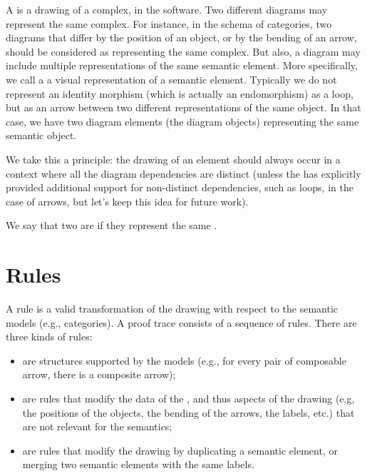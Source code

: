 \documentclass{article}
\newtheorem{remark}{Remark}[section]
\begin{document}
A \AP{} is a drawing of a complex, in the software. 
Two different diagrams may represent the same complex. For instance, in the schema of categories, two diagrams that differ by the position of an object, or by the bending of an arrow, should be considered as representing the same complex.
But also, a diagram may include multiple representations of the same semantic element. More specifically, we call a \AP{} a visual representation of a semantic element. Typically we do not represent an identity morphism (which is actually an endomorphism) as a loop, but as an arrow between two different representations of the same object. In that case, we have two diagram elements (the diagram objects) representing the same semantic object.

We take this a principle: the drawing of an element should always occur in a context where all the diagram dependencies are distinct (unless the  has explicitly provided additional support for non-distinct dependencies, such as loops, in the case of arrows, but let's keep this idea for future work).
 
We say that two  are \AP{} if they represent the same .





\section{Rules}

A rule is a valid transformation of the drawing with respect to the semantic models (e.g., categories). A proof trace consists of a sequence of rules.
There are three kinds of rules:
\begin{itemize}
    \item \AP \emph{} are structures supported by the models (e.g., for every pair of composable arrow, there is a composite arrow);
    \item \AP \emph{} are rules that modify the data of the , and thus aspects of the drawing (e.g, the positions of the objects, the bending of the arrows, the labels, etc.) that are not relevant for the semantics;
    \item \AP \emph{} are rules that modify the drawing by duplicating a semantic element, or merging two semantic elements with the same labels.
\end{itemize}
\end{document}
